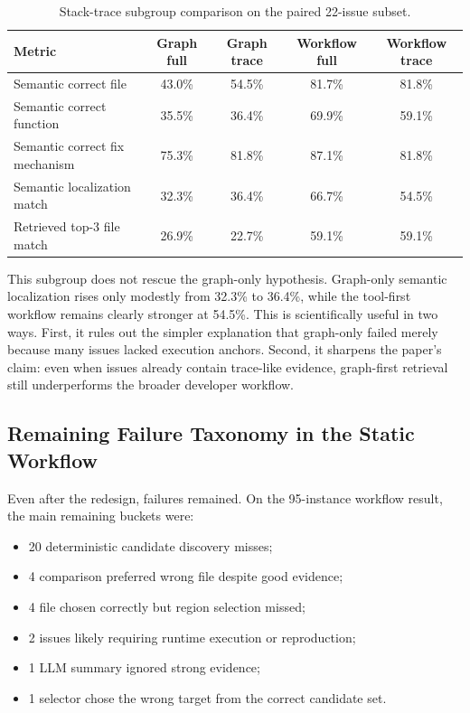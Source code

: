 \documentclass[11pt]{article}
\begin{document}
\begin{table}[t]
\centering
\small
\begin{tabular}{lcccc}
\toprule
Metric & Graph full & Graph trace & Workflow full & Workflow trace \\
\midrule
Semantic correct file & 43.0\% & 54.5\% & 81.7\% & 81.8\% \\
Semantic correct function & 35.5\% & 36.4\% & 69.9\% & 59.1\% \\
Semantic correct fix mechanism & 75.3\% & 81.8\% & 87.1\% & 81.8\% \\
Semantic localization match & 32.3\% & 36.4\% & 66.7\% & 54.5\% \\
Retrieved top-3 file match & 26.9\% & 22.7\% & 59.1\% & 59.1\% \\
\bottomrule
\end{tabular}
\caption{Stack-trace subgroup comparison on the paired 22-issue subset.}
\label{tab:stacktrace-subgroup}
\end{table}

This subgroup does not rescue the graph-only hypothesis. Graph-only semantic localization rises only modestly from 32.3\% to 36.4\%, while the tool-first workflow remains clearly stronger at 54.5\%. This is scientifically useful in two ways. First, it rules out the simpler explanation that graph-only failed merely because many issues lacked execution anchors. Second, it sharpens the paper’s claim: even when issues already contain trace-like evidence, graph-first retrieval still underperforms the broader developer workflow.

\subsection{Remaining Failure Taxonomy in the Static Workflow}

Even after the redesign, failures remained. On the 95-instance workflow result, the main remaining buckets were:

\begin{itemize}
\item 20 deterministic candidate discovery misses;
\item 4 comparison preferred wrong file despite good evidence;
\item 4 file chosen correctly but region selection missed;
\item 2 issues likely requiring runtime execution or reproduction;
\item 1 LLM summary ignored strong evidence;
\item 1 selector chose the wrong target from the correct candidate set.
\end{itemize}
\end{document}
